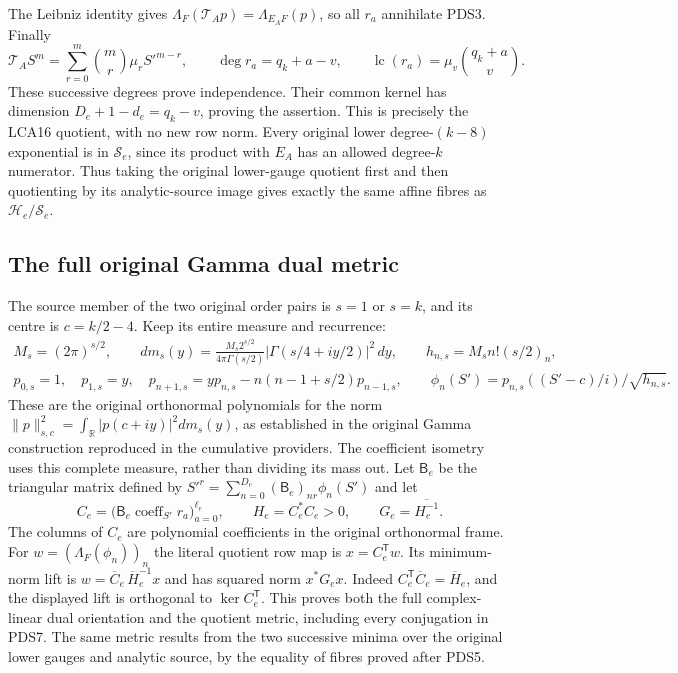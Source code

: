 \documentclass[10pt]{article}
\begin{document}
The Leibniz identity gives
$\Lambda_F(\mathcal T_Ap)=\Lambda_{E_AF}(p)$, so all $r_a$ annihilate
PDS3. Finally
\[
 \mathcal T_AS^m=\sum_{r=0}^m\binom mr\mu_r S'^{m-r},\qquad
 \deg r_a=q_k+a-v,\qquad
 \operatorname{lc}(r_a)=\mu_v\binom{q_k+a}{v}.
\tag{PDS5}
\]
These successive degrees prove independence. Their common kernel has
dimension $D_e+1-d_e=q_k-v$, proving the assertion. This is precisely
the LCA16 quotient, with no new row norm. Every original lower
degree-$(k-8)$ exponential is in $\mathcal S_e$, since its product
with $E_A$ has an allowed degree-$k$ numerator. Thus taking the
original lower-gauge quotient first and then quotienting by its
analytic-source image gives exactly the same affine fibres as
$\mathcal H_e/\mathcal S_e$.

\subsection{The full original Gamma dual metric}

The source member of the two original order pairs is $s=1$ or $s=k$,
and its centre is $c=k/2-4$. Keep its entire measure and recurrence:
\[
\begin{gathered}
 M_s=(2\pi)^{s/2},\qquad
 dm_s(y)=\frac{M_s2^{s/2}}{4\pi\Gamma(s/2)}
           |\Gamma(s/4+iy/2)|^2\,dy,\qquad
 h_{n,s}=M_s n!(s/2)_n,\\
 p_{0,s}=1,\quad p_{1,s}=y,\quad
 p_{n+1,s}=yp_{n,s}-n(n-1+s/2)p_{n-1,s},\qquad
 \phi_n(S')=p_{n,s}((S'-c)/i)/\sqrt{h_{n,s}}.
\end{gathered}\tag{PDS6}
\]
These are the original orthonormal polynomials for the norm
$\|p\|_{s,c}^2=\int_{\mathbb R}|p(c+iy)|^2dm_s(y)$,
as established in the original Gamma construction reproduced in the
cumulative providers. The coefficient isometry uses this complete
measure, rather than dividing its mass out. Let $\mathsf B_e$ be
the triangular matrix defined by
$S'^r=\sum_{n=0}^{D_e}(\mathsf B_e)_{nr}\phi_n(S')$ and let
\[
 C_e=\bigl(\mathsf B_e\operatorname{coeff}_{S'}r_a\bigr)_{a=0}^{\ell_e},
 \qquad H_e=C_e^*C_e>0,\qquad G_e=\overline{H_e^{-1}}.
\tag{PDS7}
\]
The columns of $C_e$ are polynomial coefficients in the original
orthonormal frame. For $w=(\Lambda_F(\phi_n))_n$ the literal
quotient row map is $x=C_e^{\mathsf T}w$. Its minimum-norm lift is
$w=\overline C_e\,\overline H_e^{-1}x$ and has squared norm
$x^*G_ex$. Indeed $C_e^{\mathsf T}\overline C_e=\overline H_e$,
and the displayed lift is orthogonal to $\ker C_e^{\mathsf T}$.
This proves both the full complex-linear dual orientation and the
quotient metric, including every conjugation in PDS7. The same metric
results from the two successive minima over the original lower
gauges and analytic source, by the equality of fibres proved after
PDS5.
\end{document}

